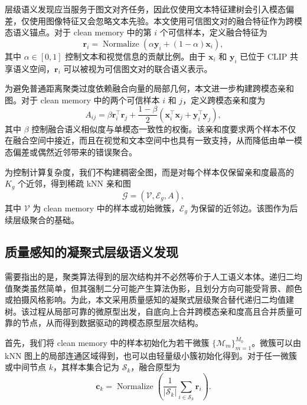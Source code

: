 层级语义发现应当服务于图文对齐任务，因此仅使用文本特征建树会引入模态偏差，仅使用图像特征又会忽略文本先验。本文使用可信图文对的融合特征作为跨模态语义锚点。对于 clean memory 中的第 $i$ 个可信样本，定义融合特征为
\begin{equation}
    \boldsymbol{r}_i
    =
    \operatorname{Normalize}
    \left(
    \alpha\boldsymbol{y}_i + (1-\alpha)\boldsymbol{x}_i
    \right),
\end{equation}
其中 $\alpha\in[0,1]$ 控制文本和视觉信息的贡献比例。由于 $\boldsymbol{x}_i$ 和 $\boldsymbol{y}_i$ 已位于 CLIP 共享语义空间，$\boldsymbol{r}_i$ 可以被视为可信图文对的联合语义表示。

为避免普通距离聚类过度依赖融合向量的局部几何，本文进一步构建跨模态亲和图。对于 clean memory 中的两个可信样本 $i$ 和 $j$，定义跨模态亲和度为
\begin{equation}
    A_{ij}
    =
    \beta \boldsymbol{r}_i^{\top}\boldsymbol{r}_j
    +
    \frac{1-\beta}{2}
    \left(
    \boldsymbol{x}_i^{\top}\boldsymbol{x}_j
    +
    \boldsymbol{y}_i^{\top}\boldsymbol{y}_j
    \right),
\end{equation}
其中 $\beta$ 控制融合语义相似度与单模态一致性的权衡。该亲和度要求两个样本不仅在融合空间中接近，而且在视觉和文本空间中也具有一致支持，从而降低由单一模态偏差或偶然近邻带来的错误聚合。

为控制计算复杂度，我们不构建稠密全图，而是对每个样本仅保留亲和度最高的 $K_g$ 个近邻，得到稀疏 kNN 亲和图
\begin{equation}
    \mathcal{G}=(\mathcal{V},\mathcal{E}_g,A),
\end{equation}
其中 $\mathcal{V}$ 为 clean memory 中的样本或初始微簇，$\mathcal{E}_g$ 为保留的近邻边。该图作为后续层级聚合的基础。

\subsection{质量感知的凝聚式层级语义发现}

需要指出的是，聚类算法得到的层次结构并不必然等价于人工语义本体。递归二均值聚类虽然简单，但其强制二分可能产生算法伪影，且划分方向可能受背景、颜色或拍摄风格影响。为此，本文采用质量感知的凝聚式层级聚合替代递归二均值建树。该过程从局部可靠的微原型出发，自底向上合并跨模态亲和度高且合并质量可靠的节点，从而得到数据驱动的跨模态原型层次结构。

首先，我们将 clean memory 中的样本初始化为若干微簇 $\{\mathcal{M}_m\}_{m=1}^{M_0}$。微簇可以由 kNN 图上的局部连通区域得到，也可以由轻量级小簇初始化得到。对于任一微簇或中间节点 $k$，其样本集合记为 $\mathcal{S}_k$，融合原型为
\begin{equation}
    \boldsymbol{c}_k
    =
    \operatorname{Normalize}
    \left(
    \frac{1}{|\mathcal{S}_k|}
    \sum_{i\in\mathcal{S}_k}\boldsymbol{r}_i
    \right).
\end{equation}

